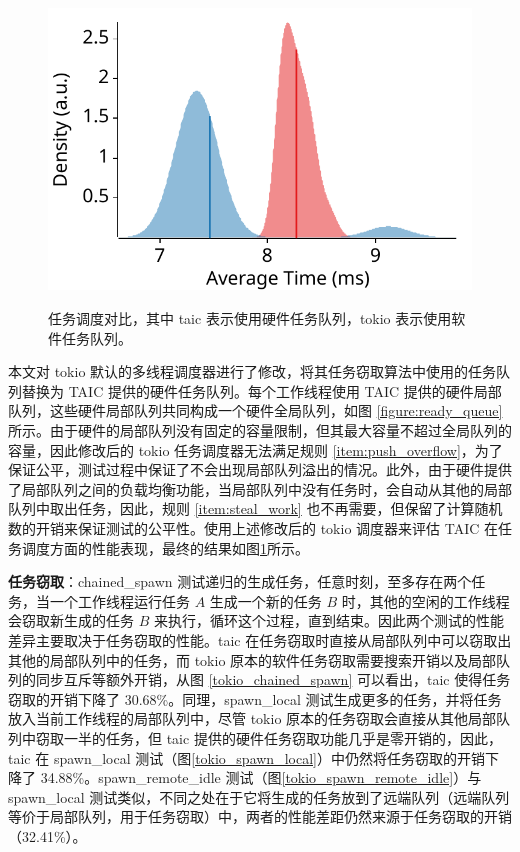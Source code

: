 \begin{figure}[htbp]
\begin{minipage}[c]{0.32\textwidth}
		\includegraphics[width=\textwidth]{figures/tokio/spawn_remote_busy.pdf}
		\label{tokio_spawn_remote_busy}
	\end{minipage}
    \caption{任务调度对比，其中 taic 表示使用硬件任务队列，tokio 表示使用软件任务队列。}
    \label{figure:tokio-bench}
\end{figure}

本文对 tokio 默认的多线程调度器进行了修改，将其任务窃取算法中使用的任务队列替换为 TAIC 提供的硬件任务队列。每个工作线程使用 TAIC 提供的硬件局部队列，这些硬件局部队列共同构成一个硬件全局队列，如图 \ref{figure:ready_queue} 所示。由于硬件的局部队列没有固定的容量限制，但其最大容量不超过全局队列的容量，因此修改后的 tokio 任务调度器无法满足规则 \ref{item:push_overflow}，为了保证公平，测试过程中保证了不会出现局部队列溢出的情况。此外，由于硬件提供了局部队列之间的负载均衡功能，当局部队列中没有任务时，会自动从其他的局部队列中取出任务，因此，规则 \ref{item:steal_work} 也不再需要，但保留了计算随机数的开销来保证测试的公平性。使用上述修改后的 tokio 调度器来评估 TAIC 在任务调度方面的性能表现，最终的结果如图\ref{figure:tokio-bench}所示。

\textbf{任务窃取}：chained\_spawn 测试递归的生成任务，任意时刻，至多存在两个任务，当一个工作线程运行任务 $A$ 生成一个新的任务 $B$ 时，其他的空闲的工作线程会窃取新生成的任务 $B$ 来执行，循环这个过程，直到结束。因此两个测试的性能差异主要取决于任务窃取的性能。taic 在任务窃取时直接从局部队列中可以窃取出其他的局部队列中的任务，而 tokio 原本的软件任务窃取需要搜索开销以及局部队列的同步互斥等额外开销，从图 \ref{tokio_chained_spawn} 可以看出，taic 使得任务窃取的开销下降了 30.68\%。同理，spawn\_local 测试生成更多的任务，并将任务放入当前工作线程的局部队列中，尽管 tokio 原本的任务窃取会直接从其他局部队列中窃取一半的任务，但 taic 提供的硬件任务窃取功能几乎是零开销的，因此，taic 在 spawn\_local 测试（图\ref{tokio_spawn_local}）中仍然将任务窃取的开销下降了 34.88\%。spawn\_remote\_idle 测试（图\ref{tokio_spawn_remote_idle}）与 spawn\_local 测试类似，不同之处在于它将生成的任务放到了远端队列（远端队列等价于局部队列，用于任务窃取）中，两者的性能差距仍然来源于任务窃取的开销（32.41\%）。

